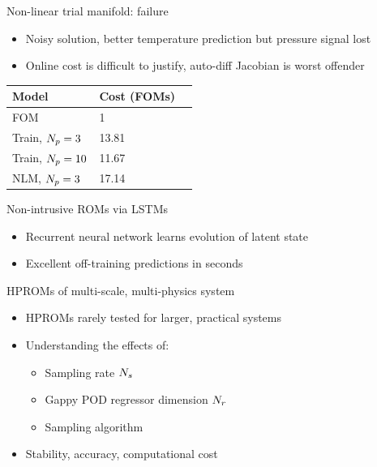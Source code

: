\documentclass[]{beamer}
\begin{document}
\begin{frame}{Non-linear trial manifold: failure}
	\begin{itemize}
		\item Noisy solution, better temperature prediction but pressure signal lost
		\item Online cost is difficult to justify, auto-diff Jacobian is worst offender 
	\end{itemize}
	\vspace{1em}
	\begin{minipage}{0.6\linewidth}
		\begin{figure}
		\end{figure}
	\end{minipage}
	\begin{minipage}{0.39\linewidth}
		\scriptsize
		\begin{table}
			\centering
			\begin{tabular}{ lll }
			\toprule
			Model & Cost (FOMs)  \\
			\midrule
			FOM & 1 \\
			Train, $N_p = 3$ & 13.81 \\
			Train, $N_p = 10$ & 11.67 \\
			NLM, $N_p = 3$ & 17.14 \\
			\bottomrule
			\end{tabular}
		\end{table}
	\end{minipage}
\end{frame}

\begin{frame}{Non-intrusive ROMs via LSTMs}
	\begin{itemize}
		\item Recurrent neural network learns evolution of latent state
		\item Excellent off-training predictions in seconds
	\end{itemize}
	\begin{figure}
	\end{figure}
\end{frame}

\begin{frame}{HPROMs of multi-scale, multi-physics system}
	\begin{itemize}
		\item HPROMs rarely tested for larger, practical systems
		\item Understanding the effects of:
		\begin{itemize}
			\item Sampling rate $N_s$
			\item Gappy POD regressor dimension $N_r$
			\item Sampling algorithm
		\end{itemize}
		\item Stability, accuracy, computational cost
	\end{itemize}
\end{frame}
\end{document}
